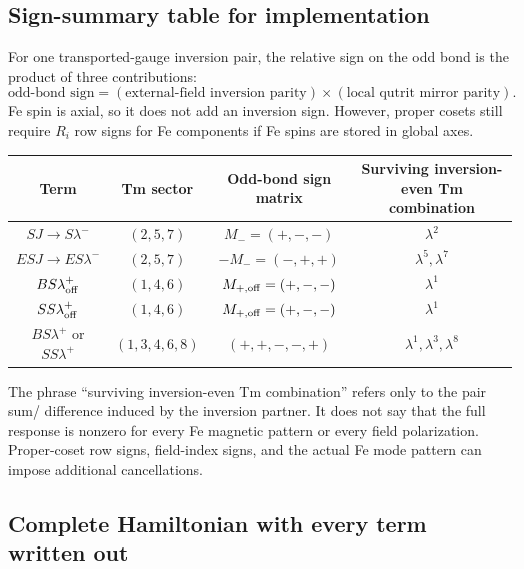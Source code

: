 \documentclass[11pt,a4paper]{article}
\begin{document}
\subsection{Sign-summary table for implementation}

For one transported-gauge inversion pair, the relative sign on the odd bond is the product of three contributions:
\begin{equation}
  \boxed{
  \text{odd-bond sign}
  =
  (\text{external-field inversion parity})
  \times
  (\text{local qutrit mirror parity}).}
\end{equation}
Fe spin is axial, so it does not add an inversion sign.  However, proper cosets still require $R_i$ row signs for Fe components if Fe spins are stored in global axes.

\begin{center}
\renewcommand{\arraystretch}{1.25}
\begin{tabular}{c c c c}
\toprule
Term & Tm sector & Odd-bond sign matrix & Surviving inversion-even Tm combination\\
\midrule
$S J \to S\lambda^-$ & $(2,5,7)$ & $M_-=(+,-,-)$ & $\lambda^2$\\
$E S J \to E S\lambda^-$ & $(2,5,7)$ & $-M_-=(-,+,+)$ & $\lambda^5,\lambda^7$\\
$B S\lambda^+_{\rm off}$ & $(1,4,6)$ & $M_{+,\rm off}=(+,-,-)$ & $\lambda^1$\\
$S S\lambda^+_{\rm off}$ & $(1,4,6)$ & $M_{+,\rm off}=(+,-,-)$ & $\lambda^1$\\
$B S\lambda^+$ or $S S\lambda^+$ & $(1,3,4,6,8)$ & $(+,+,-,-,+)$ & $\lambda^1,\lambda^3,\lambda^8$\\
\bottomrule
\end{tabular}
\end{center}

\begin{warnbox}
The phrase ``surviving inversion-even Tm combination'' refers only to the pair sum/ difference induced by the inversion partner.  It does not say that the full response is nonzero for every Fe magnetic pattern or every field polarization.  Proper-coset row signs, field-index signs, and the actual Fe mode pattern can impose additional cancellations.
\end{warnbox}

\subsection{Complete Hamiltonian with every term written out}
\label{sec:full-h}
\label{sec:full-H}
\end{document}

